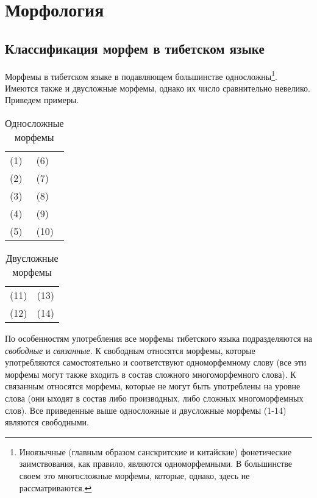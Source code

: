 \chapter{Морфология}

\section{Классификация морфем в тибетском языке}

Морфемы в тибетском языке в подавляющем большинстве односложны\footnote[19]{Иноязычные (главным образом санскритские и китайские) фонетические заимствования, как правило, являются одноморфемными. В большинстве своем это многосложные морфемы, которые, однако, здесь не рассматриваются.}. Имеются также и двусложные морфемы, однако их число сравнительно невелико. Приведем примеры.

\begin{longtabu} to \linewidth{X[1,l]|X[1,l]}
    \caption{Односложные морфемы}\\
    (1)  & (6) \\
    (2)  & (7) \\
    (3)  & (8) \\
    (4)  & (9) \\
    (5)  & (10) \\
\end{longtabu}

\begin{longtabu} to \linewidth{X[1,l]|X[1,l]}
    \caption{Двусложные морфемы}\\
    (11)  & (13) \\
    (12)  & (14) \\
\end{longtabu}

По особенностям употребления все морфемы тибетского языка подразделяются на \emph{свободные} и \emph{связанные}. К свободным относятся морфемы, которые употребляются самостоятельно и соответствуют одноморфемному слову (все эти морфемы могут также входить в состав сложного многоморфемного слова). К связанным относятся морфемы, которые не могут быть употреблены на уровне слова (они ыходят в состав либо производных, либо сложных многоморфемных слов). Все приведенные выше односложные и двусложные морфемы (1-14) являются свободными.

